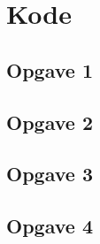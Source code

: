 \chapter{Kode}
\section{Opgave 1}


\clearpage
\section{Opgave 2}


\clearpage
\section{Opgave 3}


\clearpage
\section{Opgave 4}

